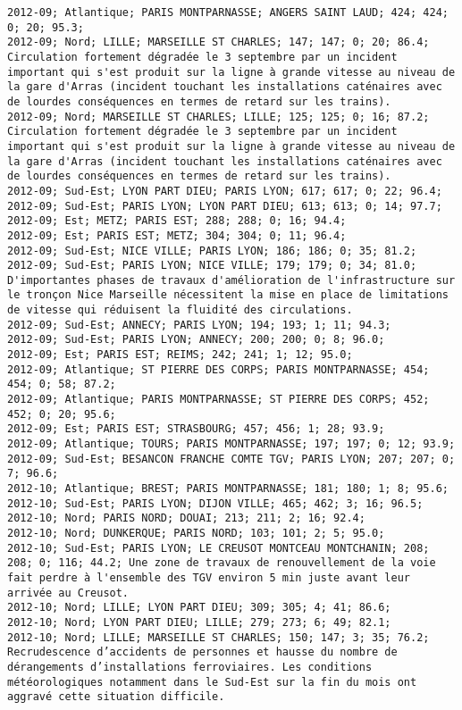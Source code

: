 \documentclass{article}
\begin{document}
\begin{Verbatim}[commandchars=\\\{\}]
2012-09; Atlantique; PARIS MONTPARNASSE; ANGERS SAINT LAUD; 424; 424; 0; 20; 95.3; 
2012-09; Nord; LILLE; MARSEILLE ST CHARLES; 147; 147; 0; 20; 86.4; Circulation fortement dégradée le 3 septembre par un incident important qui s'est produit sur la ligne à grande vitesse au niveau de la gare d'Arras (incident touchant les installations caténaires avec de lourdes conséquences en termes de retard sur les trains).
2012-09; Nord; MARSEILLE ST CHARLES; LILLE; 125; 125; 0; 16; 87.2; Circulation fortement dégradée le 3 septembre par un incident important qui s'est produit sur la ligne à grande vitesse au niveau de la gare d'Arras (incident touchant les installations caténaires avec de lourdes conséquences en termes de retard sur les trains).
2012-09; Sud-Est; LYON PART DIEU; PARIS LYON; 617; 617; 0; 22; 96.4; 
2012-09; Sud-Est; PARIS LYON; LYON PART DIEU; 613; 613; 0; 14; 97.7; 
2012-09; Est; METZ; PARIS EST; 288; 288; 0; 16; 94.4; 
2012-09; Est; PARIS EST; METZ; 304; 304; 0; 11; 96.4; 
2012-09; Sud-Est; NICE VILLE; PARIS LYON; 186; 186; 0; 35; 81.2; 
2012-09; Sud-Est; PARIS LYON; NICE VILLE; 179; 179; 0; 34; 81.0; D'importantes phases de travaux d'amélioration de l'infrastructure sur le tronçon Nice Marseille nécessitent la mise en place de limitations de vitesse qui réduisent la fluidité des circulations.
2012-09; Sud-Est; ANNECY; PARIS LYON; 194; 193; 1; 11; 94.3; 
2012-09; Sud-Est; PARIS LYON; ANNECY; 200; 200; 0; 8; 96.0; 
2012-09; Est; PARIS EST; REIMS; 242; 241; 1; 12; 95.0; 
2012-09; Atlantique; ST PIERRE DES CORPS; PARIS MONTPARNASSE; 454; 454; 0; 58; 87.2; 
2012-09; Atlantique; PARIS MONTPARNASSE; ST PIERRE DES CORPS; 452; 452; 0; 20; 95.6; 
2012-09; Est; PARIS EST; STRASBOURG; 457; 456; 1; 28; 93.9; 
2012-09; Atlantique; TOURS; PARIS MONTPARNASSE; 197; 197; 0; 12; 93.9; 
2012-09; Sud-Est; BESANCON FRANCHE COMTE TGV; PARIS LYON; 207; 207; 0; 7; 96.6; 
2012-10; Atlantique; BREST; PARIS MONTPARNASSE; 181; 180; 1; 8; 95.6; 
2012-10; Sud-Est; PARIS LYON; DIJON VILLE; 465; 462; 3; 16; 96.5; 
2012-10; Nord; PARIS NORD; DOUAI; 213; 211; 2; 16; 92.4; 
2012-10; Nord; DUNKERQUE; PARIS NORD; 103; 101; 2; 5; 95.0; 
2012-10; Sud-Est; PARIS LYON; LE CREUSOT MONTCEAU MONTCHANIN; 208; 208; 0; 116; 44.2; Une zone de travaux de renouvellement de la voie fait perdre à l'ensemble des TGV environ 5 min juste avant leur arrivée au Creusot.
2012-10; Nord; LILLE; LYON PART DIEU; 309; 305; 4; 41; 86.6; 
2012-10; Nord; LYON PART DIEU; LILLE; 279; 273; 6; 49; 82.1; 
2012-10; Nord; LILLE; MARSEILLE ST CHARLES; 150; 147; 3; 35; 76.2; Recrudescence d’accidents de personnes et hausse du nombre de dérangements d’installations ferroviaires. Les conditions météorologiques notamment dans le Sud-Est sur la fin du mois ont aggravé cette situation difficile.

\end{Verbatim}
\end{document}

